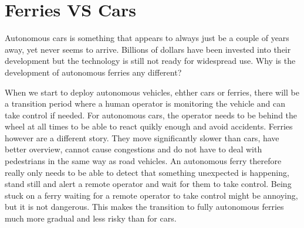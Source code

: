 \documentclass{iopconfser}
\begin{document}
\section*{Ferries VS Cars}
Autonomous cars is something that appears to always just be a couple of years away, yet never seems to arrive.
Billions of dollars have been invested into their development but the technology is still not ready for widespread use. 
Why is the development of autonomous ferries any different?

When we start to deploy autonomous vehicles, ehther cars or ferries, there will be a transition period where a human operator is monitoring the vehicle and can take control if needed. 
For autonomous cars, the operator needs to be behind the wheel at all times to be able to react quikly enough and avoid accidents.
Ferries however are a different story.
They move significantly slower than cars, have better overview, cannot cause congestions and do not have to deal with pedestrians in the same way as road vehicles.
An autonomous ferry therefore really only needs to be able to detect that something unexpected is happening, stand still and alert a remote operator and wait for them to take control.
Being stuck on a ferry waiting for a remote operator to take control might be annoying, but it is not dangerous.
This makes the transition to fully autonomous ferries much more gradual and less risky than for cars.





\printbibliography
\end{document}

